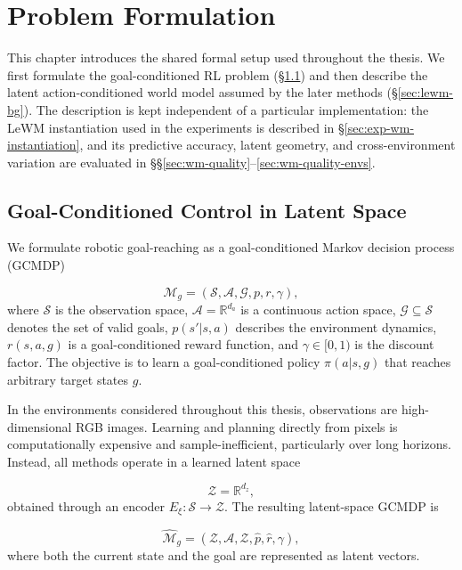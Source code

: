 \chapter{Problem Formulation}
\label{chap:foundations}
This chapter introduces the shared formal setup used throughout the
thesis. We first formulate the goal-conditioned RL problem
(\S\ref{sec:problem}) and then describe the latent action-conditioned
world model assumed by the later methods (\S\ref{sec:lewm-bg}). The
description is kept independent of a particular implementation: the
LeWM instantiation used in the experiments is described in
\S\ref{sec:exp-wm-instantiation}, and its predictive accuracy, latent
geometry, and cross-environment variation are evaluated in
\S\S\ref{sec:wm-quality}--\ref{sec:wm-quality-envs}.

\section{Goal-Conditioned Control in Latent Space}
\label{sec:problem}

We formulate robotic goal-reaching as a goal-conditioned Markov
decision process (GCMDP)

\begin{equation}
\mathcal{M}_g =
(\mathcal{S}, \mathcal{A}, \mathcal{G}, p, r, \gamma),
\end{equation}
where $\mathcal{S}$ is the observation space,
$\mathcal{A}=\mathbb{R}^{d_a}$ is a continuous action space,
$\mathcal{G}\subseteq\mathcal{S}$ denotes the set of valid goals,
$p(s'|s,a)$ describes the environment dynamics,
$r(s,a,g)$ is a goal-conditioned reward function, and
$\gamma\in[0,1)$ is the discount factor. The objective is to learn a
goal-conditioned policy $\pi(a|s,g)$ that reaches arbitrary target
states $g$.

In the environments considered throughout this thesis, observations are
high-dimensional RGB images. Learning and planning directly from pixels
is computationally expensive and sample-inefficient, particularly over
long horizons.
Instead, all methods operate in a learned latent space

\begin{equation}
\mathcal{Z}=\mathbb{R}^{d_z},
\end{equation}
obtained through an encoder
$E_\xi:\mathcal{S}\rightarrow\mathcal{Z}$.
The resulting latent-space GCMDP is

\begin{equation}
\widehat{\mathcal{M}}_g
=
(\mathcal{Z}, \mathcal{A}, \mathcal{Z}, \hat p, \hat r, \gamma),
\end{equation}
where both the current state and the goal are represented as latent
vectors.

